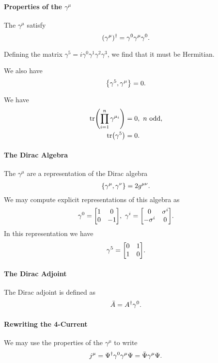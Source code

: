 \paragraph{Properties of the $\gamma^{\mu}$}
The $\gamma^{\mu}$ satisfy
\begin{align*}
	(\gamma^{\mu})^{\dagger} = \gamma^{0}\gamma^{\mu}\gamma^{0}.
\end{align*}

Defining the matrix $\gamma^{5} = i\gamma^{0}\gamma^{1}\gamma^{2}\gamma^{3}$, we find that it must be Hermitian.

We also have
\begin{align*}
	\acomm{\gamma^{5}}{\gamma^{\mu}} = 0.
\end{align*}

We have
\begin{align*}
	\tr(\prod\limits_{i = 1}^{n}\gamma^{\mu_{i}}) &= 0,\ n\text{ odd}, \\
	\tr(\gamma^{5})                               &= 0.
\end{align*}

\paragraph{The Dirac Algebra}
The $\gamma^{\mu}$ are a representation of the Dirac algebra
\begin{align*}
	\acomm{\gamma^{\mu}}{\gamma^{\nu}} = 2g^{\mu\nu}.
\end{align*}
We may compute explicit representations of this algebra as
\begin{align*}
	\gamma^{0} = 
	\mqty[
		1 & 0 \\
		0 & -1
	],\ 
	\gamma^{i} = 
	\mqty[
		0           & \sigma^{i} \\
		-\sigma^{i} & 0
	].
\end{align*}
In this representation we have
\begin{align*}
	\gamma^{5} =
	\mqty[
		0 & 1 \\
		1 & 0
	].
\end{align*}

\paragraph{The Dirac Adjoint}
The Dirac adjoint is defined as
\begin{align*}
	\bar{A} = A^{\dagger}\gamma^{0}.
\end{align*}

\paragraph{Rewriting the 4-Current}
We may use the properties of the $\gamma^{\mu}$ to write
\begin{align*}
	j^{\mu} = \Psi^{\dagger}\gamma^{0}\gamma^{\mu}\Psi = \bar{\Psi}\gamma^{\mu}\Psi.
\end{align*}

